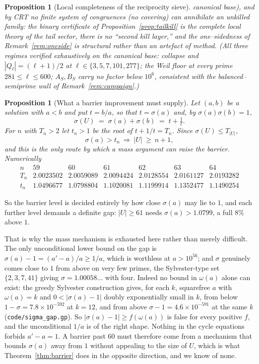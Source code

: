 \documentclass[11pt]{article}
\newtheorem{proposition}[theorem]{Proposition}
\theoremstyle{definition}
\begin{document}
\begin{proposition}[Local completeness of the reciprocity sieve]
canonical base), and by CRT \emph{no finite system of congruences (no covering) can annihilate an
unkilled family}: the binary certificate of Proposition~\ref{prop:tailkill} is the complete local theory
of the tail sector, there is no ``second kill layer,'' and the one--sidedness of
Remark~\ref{rem:oneside} is structural rather than an artefact of method. (All three regimes verified
exhaustively on the canonical base: collapse and $|Q_\ell|=(\ell+1)/2$ at
$\ell\in\{3,5,7,101,277\}$; the Weil floor at every prime $281\le\ell\le600$; $A_S,B_S$ carry no factor
below $10^6$, consistent with the balanced--semiprime wall of Remark~\ref{rem:campaign}.)
\end{proposition}

\begin{proposition}[What a barrier improvement must supply]\label{prop:barthreshold}
Let $(a,b)$ be a solution with $a<b$ and put $t=b/a$, so that $t=\sigma(a)$ and, by
$\sigma(a)\sigma(b)=1$,
\[ \sigma(U)\;=\;\sigma(a)+\sigma(b)\;=\;t+\tfrac1t. \]
For $n$ with $T_n>2$ let $t_n>1$ be the root of $t+1/t=T_n$. Since $\sigma(U)\le T_{|U|}$,
\[ \sigma(a)>t_n\ \Longrightarrow\ |U|\ \ge\ n+1, \]
and this is the only route by which a mass argument can raise the barrier. Numerically
\[
\begin{array}{l|cccccc}
n & 59 & 60 & 61 & 62 & 63 & 64\\\hline
T_n & 2.0023502 & 2.0059089 & 2.0094424 & 2.0128554 & 2.0161127 & 2.0193282\\
t_n & 1.0496677 & 1.0798804 & 1.1020081 & 1.1199914 & 1.1352477 & 1.1490254
\end{array}
\]
\end{proposition}

So the barrier level is decided entirely by how close $\sigma(a)$ may lie to $1$, and each further
level demands a definite gap: $|U|\ge61$ needs $\sigma(a)>1.0799$, a full $8\%$ above $1$.

That is why the mass mechanism is exhausted here rather than merely difficult. The only
unconditional lower bound on the gap is $\sigma(a)-1=(a'-a)/a\ge1/a$, which is worthless at
$a>10^{56}$; and $\sigma$ genuinely comes close to $1$ from above on very few primes, the
Sylvester-type set $\{2,3,7,41\}$ giving $\sigma=1.00058\ldots$ with four. Indeed no bound in
$\omega(a)$ alone can exist: the greedy Sylvester construction gives, for each $k$, squarefree $a$
with $\omega(a)=k$ and $0<|\sigma(a)-1|$ doubly exponentially small in $k$, from below
$1-\sigma=7.8\times10^{-592}$ at $k=12$, and from above $\sigma-1=4.6\times10^{-591}$ at the same
$k$ \textup{(\texttt{code/sigma\_gap.gp})}. So $|\sigma(a)-1|\ge f(\omega(a))$ is false for every
positive $f$, and the unconditional $1/a$ is of the right shape. Nothing in the cycle
equations forbids $a'-a=1$. A barrier past $60$ must therefore come from a mechanism that bounds
$\sigma(a)$ away from $1$ without appealing to the size of $U$, which is what
Theorem~\ref{thm:barrier} does in the opposite direction, and we know of none.
\end{document}

